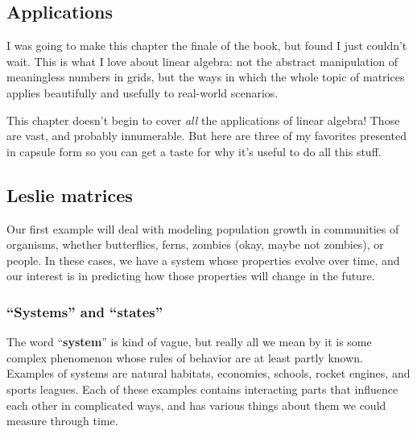 

\begin{alttitles}

\chapter{Applications}
\label{ch:apps}

I was going to make this chapter the finale of the book, but found I just
couldn't wait. This is what I love about linear algebra: not the abstract
manipulation of meaningless numbers in grids, but the ways in which the whole
topic of matrices applies beautifully and usefully to real-world scenarios.

This chapter doesn't begin to cover \textit{all} the applications of linear
algebra! Those are vast, and probably innumerable. But here are three of my
favorites presented in capsule form so you can get a taste for why it's useful
to do all this stuff.

\pagebreak

\section{Leslie matrices}

\label{sec:leslie}

Our first example will deal with modeling population growth in communities of
organisms, whether butterflies, ferns, zombies (okay, maybe not zombies), or
people. In these cases, we have a system whose properties evolve over time, and
our interest is in predicting how those properties will change in the future.

\subsection{``Systems'' and ``states''}


The word ``\textbf{system}'' is kind of vague, but really all we mean by it is
some complex phenomenon whose rules of behavior are at least partly known.
Examples of systems are natural habitats, economies, schools, rocket engines,
and sports leagues. Each of these examples contains interacting parts that
influence each other in complicated ways, and has various things about them we
could measure through time.



\end{alttitles}
